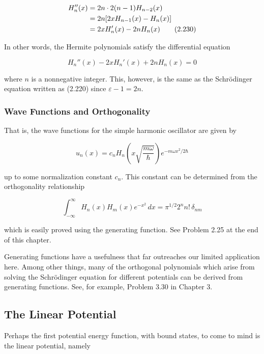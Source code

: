 \documentclass[11pt,a4paper]{article}
\begin{document}
\begin{align}
H_n''(x) &= 2n \cdot 2(n-1)H_{n-2}(x) \notag \\
&= 2n[2xH_{n-1}(x) - H_n(x)] \notag \\
&= 2xH_n'(x) - 2nH_n(x)
\tag{2.230}
\end{align}

In other words, the Hermite polynomials satisfy the differential equation

\begin{equation}
\boxed{H_n''(x) - 2xH_n'(x) + 2nH_n(x) = 0}
\tag{2.231}
\end{equation}

where $n$ is a nonnegative integer. This, however, is the same as the Schrödinger equation written as (2.220) since $\varepsilon - 1 = 2n$.

\subsubsection{Wave Functions and Orthogonality}

That is, the wave functions for the simple harmonic oscillator are given by

\begin{equation}
\boxed{u_n(x) = c_n H_n\left(x\sqrt{\frac{m\omega}{\hbar}}\right)e^{-m\omega x^2/2\hbar}}
\tag{2.232}
\end{equation}

up to some normalization constant $c_n$. This constant can be determined from the orthogonality relationship

\begin{equation}
\int_{-\infty}^{\infty}H_n(x)H_m(x)e^{-x^2}\,dx = \pi^{1/2}2^n n!\,\delta_{nm}
\tag{2.233}
\end{equation}

which is easily proved using the generating function. See Problem 2.25 at the end of this chapter.

Generating functions have a usefulness that far outreaches our limited application here. Among other things, many of the orthogonal polynomials which arise from solving the Schrödinger equation for different potentials can be derived from generating functions. See, for example, Problem 3.30 in Chapter 3.

\subsection{The Linear Potential}

Perhaps the first potential energy function, with bound states, to come to mind is the linear potential, namely
\end{document}
